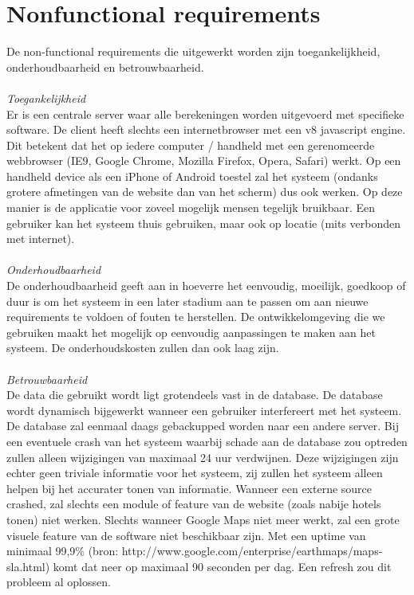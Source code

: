\documentclass[a4paper,10pt]{article}
\begin{document}
		\section{Nonfunctional requirements}
			De non-functional requirements die uitgewerkt worden zijn toegankelijkheid, onderhoudbaarheid en betrouwbaarheid.\\	\\
			\textit{Toegankelijkheid}\\
			Er is een centrale server waar alle berekeningen worden uitgevoerd met specifieke software. De client heeft slechts een internetbrowser met een v8 javascript engine. Dit betekent dat het op iedere computer / handheld met een gerenomeerde webbrowser (IE9, Google Chrome, Mozilla Firefox, Opera, Safari) werkt. Op een handheld device als een iPhone of Android toestel zal het systeem (ondanks grotere afmetingen van de website dan van het scherm) dus ook werken. Op deze manier is de applicatie voor zoveel mogelijk mensen tegelijk bruikbaar. Een gebruiker kan het systeem thuis gebruiken, maar ook op locatie (mits verbonden met internet).\\ \\
			\textit{Onderhoudbaarheid}\\
			De onderhoudbaarheid geeft aan in hoeverre het eenvoudig, moeilijk, goedkoop of duur is om het systeem in een later stadium aan te passen om aan nieuwe requirements te voldoen of fouten te herstellen. De ontwikkelomgeving die we gebruiken maakt het mogelijk op eenvoudig aanpassingen te maken aan het systeem. De onderhoudskosten zullen dan ook laag zijn.\\ \\
			\textit{Betrouwbaarheid}\\
			De data die gebruikt wordt ligt grotendeels vast in de database. De database wordt dynamisch bijgewerkt wanneer een gebruiker interfereert met het systeem. De database zal eenmaal daags gebackupped worden naar een andere server. Bij een eventuele crash van het systeem waarbij schade aan de database zou optreden zullen alleen wijzigingen van maximaal 24 uur verdwijnen. Deze wijzigingen zijn echter geen triviale informatie voor het systeem, zij zullen het systeem alleen helpen bij het accurater tonen van informatie. Wanneer een externe source crashed, zal slechts een module of feature van de website (zoals nabije hotels tonen) niet werken. Slechts wanneer Google Maps niet meer werkt, zal een grote visuele feature van de software niet beschikbaar zijn. Met een uptime van minimaal 99,9\% (bron: http://www.google.com/enterprise/earthmaps/maps-sla.html) komt dat neer op maximaal 90 seconden per dag. Een refresh zou dit probleem al oplossen.
			
\end{document}
